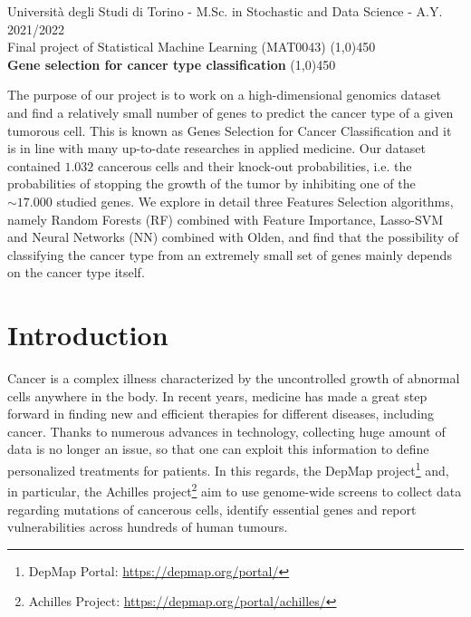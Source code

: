 \documentclass[a4paper,11pt, oneside]{article}  %
\begin{document}
\setcounter{secnumdepth}{2}
\pagestyle{plain} %

\begin{center}
	Università degli Studi di Torino - M.Sc.  in Stochastic and Data Science - A.Y.  2021/2022 \\
	\Large { Final project of Statistical Machine Learning (MAT0043)}
	\line(1,0){450}\\ 
	\vspace{0.4cm} 
	{ \huge \textbf{Gene selection for cancer type classification} }
	\vspace{0.1cm}
	\line(1,0){450} \\
\end{center}


The purpose of our project is to work on a high-dimensional genomics dataset and find a relatively small number of genes to predict the cancer type of a given tumorous cell. This is known as Genes Selection for Cancer Classification and it is in line with many up-to-date researches in applied medicine.  Our dataset contained $1.032$ cancerous cells and their knock-out probabilities, i.e.  the probabilities of stopping the growth of the tumor by inhibiting one of the $\sim 17.000$ studied genes.  We explore in detail three Features Selection algorithms,  namely Random Forests (RF) combined with Feature Importance,  Lasso-SVM and Neural Networks (NN) combined with Olden,  and find that the possibility of classifying the cancer type from an extremely small set of genes mainly depends on the cancer type itself.  


\section{Introduction}
Cancer is a complex illness characterized by the uncontrolled growth of abnormal cells anywhere in the body.  In recent years,  medicine has made a great step forward in finding new and efficient therapies for different diseases,  including cancer.  Thanks to numerous advances in technology,  collecting huge amount of data is no longer an issue,  so that one can exploit this information to define personalized treatments for patients.  In this regards,  the DepMap project\footnote{DepMap Portal: \url{https://depmap.org/portal/} } and,  in particular,  the Achilles project\footnote{Achilles Project: \url{https://depmap.org/portal/achilles/} } aim to use genome-wide screens to collect data regarding mutations of cancerous cells,  identify essential genes and report vulnerabilities across hundreds of human tumours. 
\end{document}
